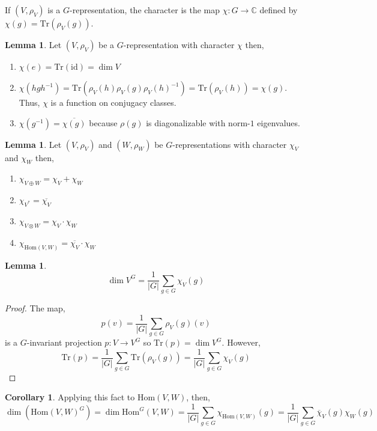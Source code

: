 \documentclass[12pt]{extarticle}
\newcommand{\C}{\mathbb{C}}
\newcommand{\tr}[1]{\mathrm{Tr} \! \left(#1\right)}
\newcommand{\id}{\mathrm{id}}
\newcommand{\Hom}[2]{\mathrm{Hom}\left( #1, #2 \right)}
\newcommand{\repHom}[3]{\mathrm{Hom}^{#1} \left( #2, #3 \right)}
\theoremstyle{definition}
\newtheorem{lemma}[theorem]{Lemma}
\newtheorem{corollary}[theorem]{Corollary}
\newenvironment{definition}[1][Definition:]{\begin{trivlist}
\item[\hskip \labelsep {\bfseries #1}]}{\end{trivlist}}
\begin{document}
\begin{definition}
If $(V, \rho_V)$ is a $G$-representation, the character is the map $\chi : G \to \C$ defined by $\chi(g) = \tr{\rho_V(g)}$.  
\end{definition}

\begin{lemma}
Let $(V, \rho_V)$ be a $G$-representation with character $\chi$ then,
\begin{enumerate}
\item $\chi(e) = \tr{\id} = \dim{V}$

\item $\chi(hgh^{-1}) = \tr{\rho_V(h) \rho_V(g) \rho_V(h)^{-1}} = \tr{\rho_V(h)} = \chi(g)$. Thus, $\chi$ is a function on conjugacy classes.

\item $\chi(g^{-1}) = \overline{\chi(g)}$ because $\rho(g)$ is diagonalizable with norm-$1$ eigenvalues. 
\end{enumerate}
\end{lemma}

\begin{lemma}
Let $(V, \rho_V)$ and $(W, \rho_W)$ be $G$-representations with character $\chi_V$ and $\chi_W$ then,
\begin{enumerate}
\item $\chi_{V \oplus W} = \chi_{V} + \chi_{W}$
\item $\chi_{V^*} = \overline{\chi_{V}}$
\item $\chi_{V \otimes W} = \chi_V \cdot \chi_W$
\item $\chi_{\Hom{V}{W}} = \overline{\chi_V} \cdot \chi_W$
\end{enumerate}
\end{lemma}

\begin{lemma}
\[ \dim{V^G} = \frac{1}{|G|} \sum_{g \in G} \chi_V(g) \]
\end{lemma}

\begin{proof}
The map,
\[ p(v) = \frac{1}{|G|} \sum_{g \in G} \rho_V(g)(v)\]
is a $G$-invariant projection $p : V \to V^G$ so $\tr{p} = \dim{V^G}$. However,
\[ \tr{p} = \frac{1}{|G|} \sum_{g \in G} \tr{\rho_V(g)} = \frac{1}{|G|} \sum_{g \in G} \chi_V(g) \]
\end{proof}

\begin{corollary}
Applying this fact to $\Hom{V}{W}$, then,
\[ \dim{(\Hom{V}{W}^G)} = \dim{\repHom{G}{V}{W}} = \frac{1}{|G|} \sum_{g \in G} \chi_{\Hom{V}{W}} (g) = \frac{1}{|G|} \sum_{g \in G} \overline{\chi}_V(g) \chi_W(g) \]
\end{corollary}
\end{document}
